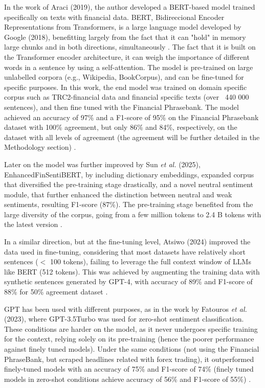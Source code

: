 \documentclass[conference]{IEEEtran}
\begin{document}
In the work of Araci (2019), the author developed a BERT-based model trained specifically on texts with financial data. BERT, Bidireccional Encoder Representations from Transformers, is a large language model developed by Google (2018), benefitting largely from the fact that it can "hold" in memory large chunks and in both directions, simultaneously \cite{devlin2019bert}. The fact that it is built on the Transformer encoder architecture, it can weigh the importance of different words in a sentence by using a self-attention. The model is pre-trained  on large unlabelled corpora (e.g., Wikipedia, BookCorpus), and can be fine-tuned for specific purposes. In this work, the end model was trained on  domain specific corpus such as TRC2-financial data and financial specific texts (over ~440 000 sentences), and then fine tuned with the Financial Phrasebank. The model achieved an accuracy of 97\% and a F1-score of 95\% on the Financial Phrasebank dataset with 100\% agreement, but only 86\% and 84\%, respectively, on the dataset with all levels of agreement (the agreement will be further detailed in the Methodology section) \cite{araci2019finbert}. 

Later on the model was further improved by Sun \textit{et al.} (2025), EnhancedFinSentiBERT, by including dictionary embeddings, expanded corpus that diversified the pre-training stage drastically, and a novel neutral sentiment module, that further enhanced the distinction between neutral and weak sentiments, resulting F1-score (87\%). The pre-training stage benefited from the large diversity of the corpus, going from a few million tokens to 2.4 B tokens with the latest version \cite{sun2025financial}.

In a similar direction, but at the fine-tuning level, Atsiwo (2024) improved the data used in fine-tuning, considering that most datasets have relatively short sentences ($<$ 100 tokens), failing to leverage the full context window  of LLMs like BERT (512 tokens). This was achieved by augmenting  the training data with synthetic sentences generated by GPT-4, with accuracy of 89\% and F1-score of 88\% for 50\% agreement dataset \cite{atsiwo2024financial}. 

GPT has been used with different purposes, as in the work by Fatouros \textit{et al.} (2023), where GPT-3.5Turbo was used for zero-shot sentiment classification. These conditions are harder on the model, as it never undergoes specific training for the context, relying solely on its pre-training (hence the poorer performance against finely tuned models). Under the same conditions (not using the Financial PhraseBank, but scraped headlines related with forex trading), it outperformed finely-tuned models with an accuracy of 75\% and F1-score of 74\% (finely tuned models in zero-shot conditions achieve accuracy of 56\% and F1-score of 55\%) \cite{fatouros2023chatgpt}.
\end{document}
